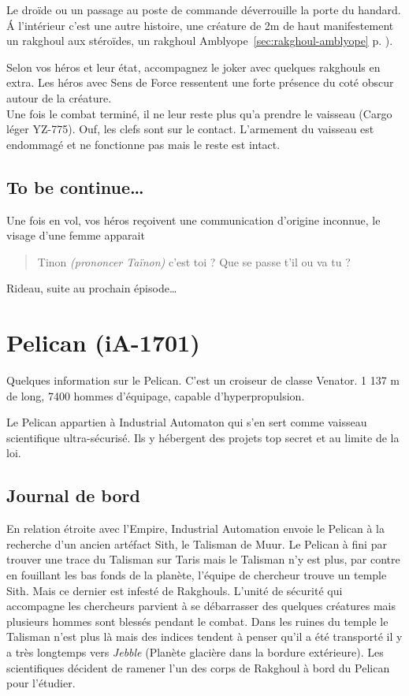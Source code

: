 Le droïde ou un passage au poste de commande déverrouille la porte du handard. \'A l’intérieur c’est une autre histoire, une créature de 2m de haut manifestement un rakghoul aux stéroïdes, un rakghoul Amblyope~\ref{sec:rakghoul-amblyope} p. \pageref{sec:rakghoul-amblyope}).

Selon vos héros et leur état, accompagnez le joker avec quelques rakghouls en extra. Les héros avec Sens de Force ressentent une forte présence du coté obscur autour de la créature.\\

Une fois le combat terminé, il ne leur reste plus qu’a prendre le vaisseau (Cargo léger YZ-775). Ouf, les clefs sont sur le contact. L’armement du vaisseau est endommagé et ne fonctionne pas mais le reste est intact.

\subsection{To be continue\ldots}
Une fois en vol, vos héros reçoivent une communication d’origine inconnue, le visage d’une femme apparait

\begin{quote}
	Tinon \emph{(prononcer Taïnon)} c’est toi ? Que se passe t’il ou va tu ?
\end{quote}

Rideau, suite au prochain épisode\ldots


\clearpage
\section{Pelican (iA-1701)}

Quelques information sur le Pelican. C’est un croiseur de classe Venator. 1 137 m de long, 7400 hommes d’équipage, capable d’hyperpropulsion.

Le Pelican appartien à Industrial Automaton qui s’en sert comme vaisseau scientifique ultra-sécurisé. Ils y hébergent des projets top secret et au limite de la loi.

\subsection{Journal de bord}
\label{sec:pelican-jdb}
En relation étroite avec l’Empire, Industrial Automation envoie le Pelican à la recherche d’un ancien artéfact Sith, le Talisman de Muur. Le Pelican à fini par trouver une trace du Talisman sur Taris mais le Talisman n’y est plus, par contre en fouillant les bas fonds de la planète, l’équipe de chercheur trouve un temple Sith. Mais ce dernier est infesté de Rakghouls. L’unité de sécurité qui accompagne les chercheurs parvient à se débarrasser des quelques créatures mais plusieurs hommes sont blessés pendant le combat. Dans les ruines du temple le Talisman n’est plus là mais des indices tendent à penser qu’il a été transporté il y a très longtemps vers \emph{Jebble} (Planète glacière dans la bordure extérieure). Les scientifiques décident de ramener l’un des corps de Rakghoul à bord du Pelican pour l’étudier.

